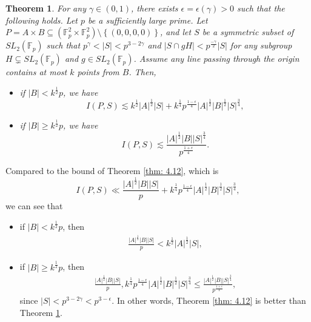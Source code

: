 \documentclass[11pt]{article}
\newtheorem{theorem}{Theorem}[section]
\def\thang#1{\noindent
\textcolor{blue}
{\textsc{(Thang:}
\textsf{#1})}}
\def\thang#1{\noindent
\textcolor{blue}
{\textsc{(Thang:}
\textsf{#1})}}
\def\Fbb{\mathbb{F}}
\def\SL{SL}
\def\lo{\left\{}
\def\ro{\right\}}
\begin{document}
\begin{theorem}\label{thm:3.7}
For any $\gamma\in (0, 1)$, there exists $\epsilon=\epsilon(\gamma)>0$ such that the following holds.
    Let $p$ be a sufficiently large prime. Let $P=A\times B \subseteq (\Fbb_p^2 \times \Fbb_p^2 ) \setminus \lo (0, 0, 0, 0)\ro$, and let $S$ be a symmetric subset of $\SL_2 (\Fbb_p )$ such that $p^\gamma < |S| < p^{3-2\gamma } $ and $ |S \cap gH| < p^{\frac{-\gamma }{2}}|S|$ for any subgroup $H \subsetneq \SL_2 (\Fbb_p) $ and $g\in \SL_2(\Fbb_p)$. Assume any line passing through the origin contains at most $k$ points from $B$. Then, 
    \begin{itemize}
        \item[(1)] if $|B|< k^{\frac{1}{2}}p$, we have 
        \[ I(P,S) \lesssim k^{\frac{1}{2}}|A|^{\frac{1}{2}} |S| + k^{\frac{1}{4}} p^{\frac{1-\epsilon}{4}} |A|^{\frac{1}{2}} |B|^{\frac{1}{2}} |S|^{\frac{3}{4}} ,\]
        \item[(2)] if $|B|\ge k^{\frac{1}{2}}p$, we have 
        \[ I(P,S) \lesssim 
        \frac{|A|^{\frac{1}{2}}|B||S|^{\frac{3}{4}}}{p^{\frac{1+ \epsilon }{4}}}.\]
    \end{itemize}
   
\end{theorem}
Compared to the
bound of Theorem \ref{thm: 4.12}, which is
\[ I(P,S) \ll \frac{|A|^{\frac{1}{2}}|B||S|}{p} + k^{\frac{1}{4}}p^{\frac{1-\epsilon}{4}}|A|^{\frac{1}{2}}|B|^{\frac{1}{2}}|S|^{\frac{3}{4}},\]
we can see that
\begin{itemize}
    \item if $|B|< k^{\frac{1}{2}}p $, then
    \begin{align*}
    \frac{|A|^\frac{1}{2}|B||S|}{p}< k^{\frac{1}{2}}|A|^{\frac{1}{2}}|S|,
\end{align*}
    \item if $|B|\ge k^{\frac{1}{2}}p $, then
    \begin{align*}
    \frac{|A|^\frac{1}{2}|B||S|}{p}, k^{\frac{1}{4}}p^{\frac{1-\epsilon}{4}}|A|^{\frac{1}{2}}|B|^\frac{1}{2}|S|^{\frac{3}{4}} \le \frac{|A|^{\frac{1}{2}}|B||S|^{\frac{3}{4}} }{p^{\frac{1+\epsilon}{4}}},
\end{align*}
since $|S|< p^{3-2\gamma} < p^{3-\epsilon}$. In other words, Theorem \ref{thm: 4.12} is better than Theorem \ref{thm:3.7}.
\end{itemize}
\end{document}
